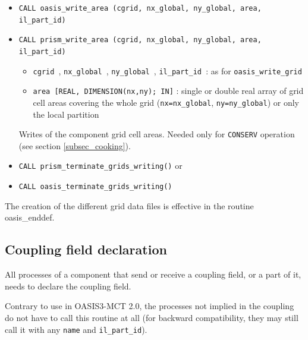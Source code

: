 \begin{itemize}
  \vspace{0.2cm}
\item {\tt CALL oasis\_write\_area (cgrid, nx\_global, ny\_global, area, il\_part\_id)}
\item {\tt CALL prism\_write\_area (cgrid, nx\_global, ny\_global, area, il\_part\_id)}

  \begin{itemize}
  \item {\tt cgrid }, {\tt nx\_global }, {\tt ny\_global }, {\tt il\_part\_id }: as for {\tt oasis\_write\_grid}
  \item {\tt area [REAL, DIMENSION(nx,ny); IN]} : single or double real array of grid cell
    areas covering the whole grid ({\tt nx=nx\_global}, {\tt ny=ny\_global}) or only the local partition 
  \end{itemize}
  Writes of the component grid cell areas. Needed only for {\tt CONSERV}
  operation (see section \ref{subsec_cooking}).

  \vspace{0.2cm}
\item {\tt CALL prism\_terminate\_grids\_writing()} or
\item {\tt CALL oasis\_terminate\_grids\_writing()}

\end{itemize}

The creation of the different grid data files is effective in the routine
oasis\_enddef.

\subsection{Coupling field declaration}
\label{subsubsec_Declaration}

All processes of a component that send or receive a coupling field, or a part of it, needs to declare the coupling field.
 
Contrary to use in OASIS3-MCT 2.0, the processes not implied in the
coupling do not have to call this routine at all (for backward
compatibility, they may still call it with any {\tt name} and {\tt il\_part\_id}).

